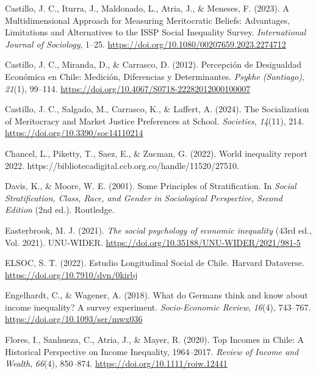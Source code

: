 \documentclass[
  12pt,
]{article}
\newlength{\cslhangindent}
\newenvironment{CSLReferences}[2] %
 {\begin{list}{}{%
  \setlength{\itemindent}{0pt}
  \setlength{\leftmargin}{0pt}
  \setlength{\parsep}{0pt}
  \ifodd #1
   \setlength{\leftmargin}{\cslhangindent}
   \setlength{\itemindent}{-1\cslhangindent}
  \fi
  \setlength{\itemsep}{#2\baselineskip}}}
 {\end{list}}
\begin{document}
\begin{CSLReferences}{1}{0}
Castillo, J. C., Iturra, J., Maldonado, L., Atria, J., \& Meneses, F.
(2023). A {Multidimensional Approach} for {Measuring Meritocratic
Beliefs}: {Advantages}, {Limitations} and {Alternatives} to the {ISSP
Social Inequality Survey}. \emph{International Journal of Sociology},
1--25. \url{https://doi.org/10.1080/00207659.2023.2274712}

Castillo, J. C., Miranda, D., \& Carrasco, D. (2012). Percepci{ó}n de
{Desigualdad Econ{ó}mica} en {Chile}: {Medici{ó}n}, {Diferencias} y
{Determinantes}. \emph{Psykhe (Santiago)}, \emph{21}(1), 99--114.
\url{https://doi.org/10.4067/S0718-22282012000100007}

Castillo, J. C., Salgado, M., Carrasco, K., \& Laffert, A. (2024). The
{Socialization} of {Meritocracy} and {Market Justice Preferences} at
{School}. \emph{Societies}, \emph{14}(11), 214.
\url{https://doi.org/10.3390/soc14110214}

Chancel, L., Piketty, T., Saez, E., \& Zucman, G. (2022). World
inequality report 2022.
https://bibliotecadigital.ccb.org.co/handle/11520/27510.

Davis, K., \& Moore, W. E. (2001). Some {Principles} of
{Stratification}. In \emph{Social {Stratification}, {Class}, {Race}, and
{Gender} in {Sociological Perspective}, {Second Edition}} (2nd ed.).
Routledge.

Easterbrook, M. J. (2021). \emph{The social psychology of economic
inequality} (43rd ed., Vol. 2021). UNU-WIDER.
\url{https://doi.org/10.35188/UNU-WIDER/2021/981-5}

ELSOC, S. T. (2022). Estudio {Longitudinal Social} de {Chile}. Harvard
Dataverse. \url{https://doi.org/10.7910/dvn/0kirbj}

Engelhardt, C., \& Wagener, A. (2018). What do {Germans} think and know
about income inequality? {A} survey experiment. \emph{Socio-Economic
Review}, \emph{16}(4), 743--767.
\url{https://doi.org/10.1093/ser/mwx036}

Flores, I., Sanhueza, C., Atria, J., \& Mayer, R. (2020). Top {Incomes}
in {Chile}: {A Historical Perspective} on {Income Inequality},
1964--2017. \emph{Review of Income and Wealth}, \emph{66}(4), 850--874.
\url{https://doi.org/10.1111/roiw.12441}


\end{CSLReferences}
\end{document}
